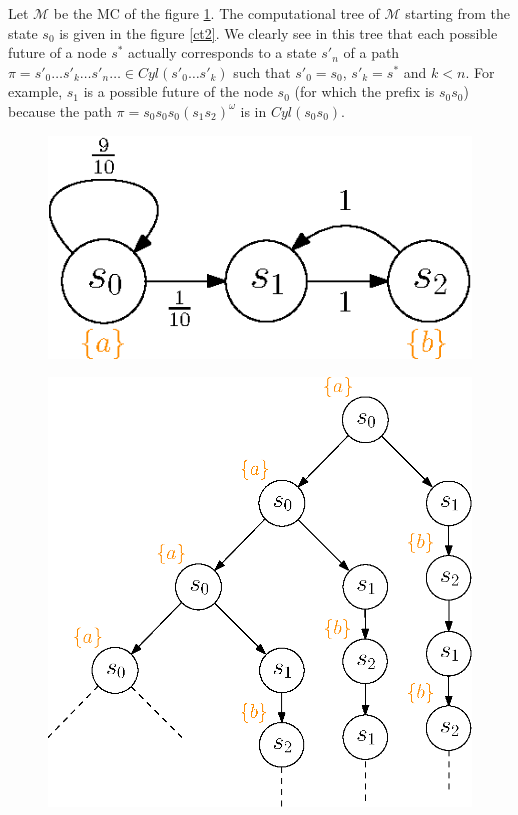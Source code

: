 \begin{example}
Let $\mathcal{M}$ be the MC of the figure \ref{ct1}. The computational tree of $\mathcal{M}$ starting from the state $s_0$ is
given in the figure \ref{ct2}. We clearly see in this tree that each possible future of a node $s^*$ actually corresponds to a state $s'_n$ of a path $\pi = s'_0 \dots s'_k \dots s'_n \dots \in Cyl(s'_0 \dots s'_k)$ such that $s'_0 = s_0$, $s'_k=s^*$ and $k < n$.
For example, $s_1$ is a possible future of the node $s_0$ (for which the prefix is $s_0s_0$) because the path $\pi = s_0s_0s_0(s_1s_2)^\omega$ is in $Cyl(s_0s_0)$.
\begin{figure}[h]
  \begin{minipage}{0.4\linewidth}
    \centering
    \includegraphics[width=0.8\linewidth]{resources/CLT_unfolding_1}
    \captionsetup{justification=centering}
    \label{ct1}
  \end{minipage}
  \begin{minipage}{0.6\linewidth}
    \centering
    \includegraphics[width=0.8\linewidth]{resources/CLT_unfolding_2}

\end{minipage}
\end{figure}
\end{example}
